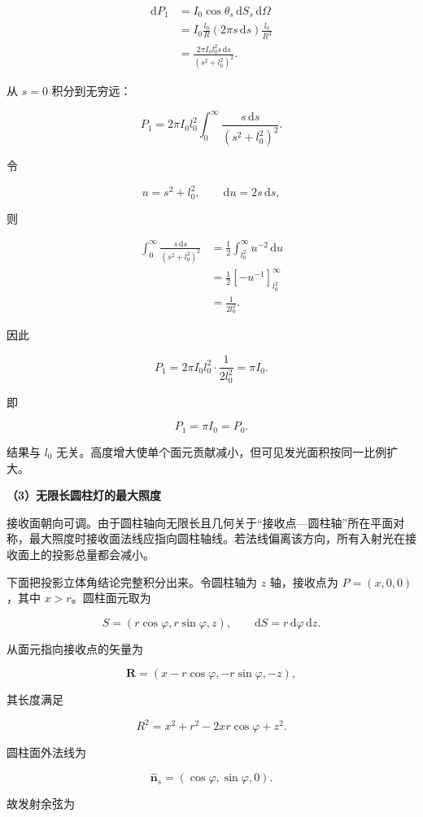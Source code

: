 \documentclass[12pt,a4paper,UTF8]{ctexart}
\begin{document}
\[
\begin{aligned}
\mathrm{d}P_1
&=I_0\cos\theta_s\,\mathrm{d}S_s\,\mathrm{d}\Omega\\
&=I_0\frac{l_0}{R}(2\pi s\,\mathrm{d}s)
\frac{l_0}{R^3}\\
&=\frac{2\pi I_0l_0^2s\,\mathrm{d}s}
{(s^2+l_0^2)^2}.
\end{aligned}
\]

从 \(s=0\) 积分到无穷远：

\[
P_1=2\pi I_0l_0^2
\int_0^\infty\frac{s\,\mathrm{d}s}{(s^2+l_0^2)^2}.
\]

令

\[u=s^2+l_0^2,
\qquad \mathrm{d}u=2s\,\mathrm{d}s,\]

则

\[
\begin{aligned}
\int_0^\infty\frac{s\,\mathrm{d}s}{(s^2+l_0^2)^2}
&=\frac12\int_{l_0^2}^{\infty}u^{-2}\,\mathrm{d}u\\
&=\frac12\left[-u^{-1}\right]_{l_0^2}^{\infty}\\
&=\frac1{2l_0^2}.
\end{aligned}
\]

因此

\[
P_1=2\pi I_0l_0^2\cdot\frac1{2l_0^2}
=\pi I_0.
\]

即

\[\boxed{P_1=\pi I_0=P_0}.\]

结果与 \(l_0\)
无关。高度增大使单个面元贡献减小，但可见发光面积按同一比例扩大。

\textbf{（3）无限长圆柱灯的最大照度}

接收面朝向可调。由于圆柱轴向无限长且几何关于``接收点---圆柱轴''所在平面对称，最大照度时接收面法线应指向圆柱轴线。若法线偏离该方向，所有入射光在接收面上的投影总量都会减小。

下面把投影立体角结论完整积分出来。令圆柱轴为 \(z\) 轴，接收点为
\(P=(x,0,0)\)，其中 \(x>r\)。圆柱面元取为

\[
S=(r\cos\varphi,r\sin\varphi,z),
\qquad
\mathrm{d}S=r\,\mathrm{d}\varphi\,\mathrm{d}z.
\]

从面元指向接收点的矢量为

\[
\bm R=(x-r\cos\varphi,-r\sin\varphi,-z),
\]

其长度满足

\[
R^2=x^2+r^2-2xr\cos\varphi+z^2.
\]

圆柱面外法线为

\[\hat{\bm n}_s=(\cos\varphi,\sin\varphi,0).\]

故发射余弦为
\end{document}
